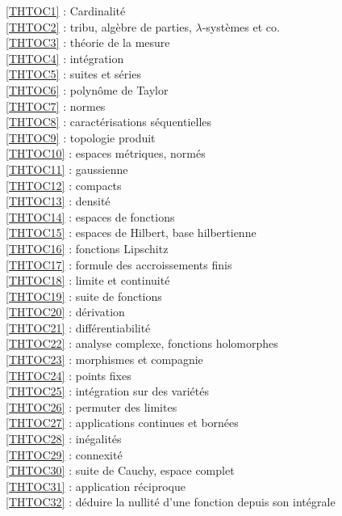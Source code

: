 \ref {THTOC1} : Cardinalité\\
\ref {THTOC2} : tribu, algèbre de parties, \( \lambda \)-systèmes et co.\\
\ref {THTOC3} : théorie de la mesure\\
\ref {THTOC4} : intégration\\
\ref {THTOC5} : suites et séries\\
\ref {THTOC6} : polynôme de Taylor\\
\ref {THTOC7} : normes\\
\ref {THTOC8} : caractérisations séquentielles\\
\ref {THTOC9} : topologie produit\\
\ref {THTOC10} : espaces métriques, normés\\
\ref {THTOC11} : gaussienne\\
\ref {THTOC12} : compacts\\
\ref {THTOC13} : densité\\
\ref {THTOC14} : espaces de fonctions\\
\ref {THTOC15} : espaces de Hilbert, base hilbertienne\\
\ref {THTOC16} : fonctions Lipschitz\\
\ref {THTOC17} : formule des accroissements finis\\
\ref {THTOC18} : limite et continuité\\
\ref {THTOC19} : suite de fonctions\\
\ref {THTOC20} : dérivation\\
\ref {THTOC21} : différentiabilité\\
\ref {THTOC22} : analyse complexe, fonctions holomorphes\\
\ref {THTOC23} : morphismes et compagnie\\
\ref {THTOC24} : points fixes\\
\ref {THTOC25} : intégration sur des variétés\\
\ref {THTOC26} : permuter des limites\\
\ref {THTOC27} : applications continues et bornées\\
\ref {THTOC28} : inégalités\\
\ref {THTOC29} : connexité\\
\ref {THTOC30} : suite de Cauchy, espace complet\\
\ref {THTOC31} : application réciproque\\
\ref {THTOC32} : déduire la nullité d'une fonction depuis son intégrale\\
